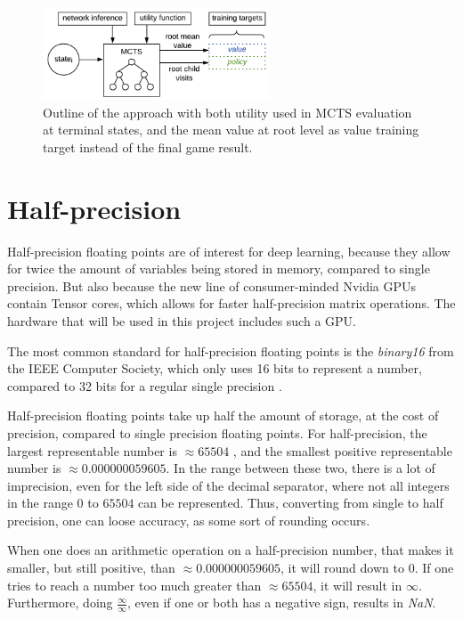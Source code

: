 \begin{figure}[ht]
	\centering
	\includegraphics[width=0.6\textwidth]{figures/training-targets-q}
	\caption{Outline of the approach with both utility used in MCTS evaluation at terminal states, and the mean value at root level as value training target instead of the final game result.}
	\label{fig-targets-q}
\end{figure}

\section{Half-precision}
Half-precision floating points are of interest for deep learning, because they allow for twice the amount of variables being stored in memory, compared to single precision. But also because the new line of consumer-minded Nvidia GPUs contain Tensor cores, which allows for faster half-precision matrix operations. The hardware that will be used in this project includes such a GPU.

The most common standard for half-precision floating points is the \textit{binary16} from the IEEE Computer Society, which only uses 16 bits to represent a number\cite{Committee2008}, compared to 32 bits for a regular single precision .

Half-precision floating points take up half the amount of storage, at the cost of precision, compared to single precision floating points. For half-precision, the largest representable number is $\approx 65504$ , and the smallest positive  representable number is $\approx 0.000000059605$. In the range between these two, there is a lot of imprecision, even for the left side of the decimal separator, where not all integers in the range $0$ to $65504$ can be represented. Thus, converting from single to half precision, one can loose accuracy, as some sort of rounding occurs.

When one does an arithmetic operation on a half-precision number, that makes it smaller, but still positive, than $\approx 0.000000059605$, it will round down to $0$. If one tries to reach a number too much greater than $\approx 65504$, it will result in $\infty$. Furthermore, doing $\frac{\infty}{\infty}$, even if one or both has a negative sign, results in \textit{NaN}.

